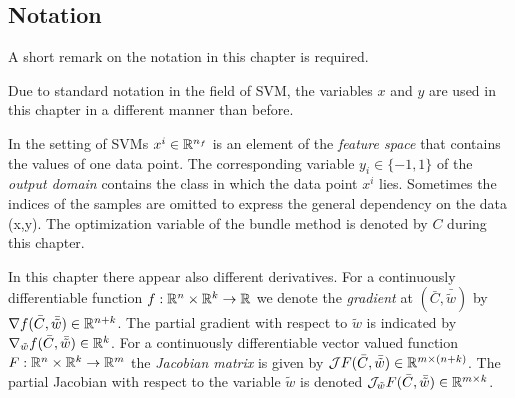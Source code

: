 

\subsection{Notation}

A short remark on the notation in this chapter is required.

Due to standard notation in the field of SVM, the variables \(x\) and \(y\) are used in this chapter in a different manner than before.

In the setting of SVMs \(x^i \in \mathbb{R}^{n_f}\) is an element of the \emph{feature space} that contains the values of one data point. The corresponding variable \(y_i \in \{-1,1\}\) of the \emph{output domain} contains the class in which the data point \(x^i\) lies. Sometimes the indices of the samples are omitted to express the general dependency on the data (x,y).
The optimization variable of the bundle method is denoted by \(C\) during this chapter.


In this chapter there appear also different derivatives.
For a continuously differentiable function \(f:\mathbb{R}^n \times \mathbb{R}^k \to \mathbb{R}\) we denote the \emph{gradient} at \((\bar{C},\bar{\tilde{w}})\) by \(\nabla f(\bar{C},\bar{\tilde{w}}) \in \mathbb{R}^{n+k}\). The partial gradient with respect to \(\tilde{w}\) is indicated by \(\nabla_{\tilde{w}}f(\bar{C},\bar{\tilde{w}}) \in \mathbb{R}^k \). %
For a continuously differentiable vector valued function \(F:\mathbb{R}^n \times \mathbb{R}^k \to \mathbb{R}^m\) the \emph{Jacobian matrix} is given by \( \mathcal{J}F(\bar{C},\bar{\tilde{w}}) \in \mathbb{R}^{m \times (n+k)}\). The partial Jacobian with respect to the variable \(\tilde{w}\) is denoted \(\mathcal{J}_{\tilde{w}} F(\bar{C},\bar{\tilde{w}}) \in \mathbb{R}^{m \times k}\).

